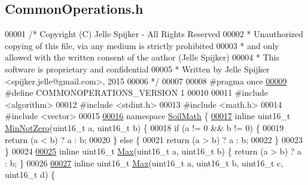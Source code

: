 \hypertarget{_common_operations_8h_source}{}\subsection{Common\+Operations.\+h}
\label{_common_operations_8h_source}

\begin{DoxyCode}
00001 \textcolor{comment}{/* Copyright (C) Jelle Spijker - All Rights Reserved}
00002 \textcolor{comment}{ * Unauthorized copying of this file, via any medium is strictly prohibited}
00003 \textcolor{comment}{ * and only allowed with the written consent of the author (Jelle Spijker)}
00004 \textcolor{comment}{ * This software is proprietary and confidential}
00005 \textcolor{comment}{ * Written by Jelle Spijker <spijker.jelle@gmail.com>, 2015}
00006 \textcolor{comment}{ */}
00007 
00008 \textcolor{preprocessor}{#pragma once}
\hypertarget{_common_operations_8h_source_l00009}{}\hyperlink{_common_operations_8h_a2eaf90dc9ea1487911cc3005ae0b1bf3}{00009} \textcolor{preprocessor}{#define COMMONOPERATIONS\_VERSION 1}
00010 
00011 \textcolor{preprocessor}{#include <algorithm>}
00012 \textcolor{preprocessor}{#include <stdint.h>}
00013 \textcolor{preprocessor}{#include <math.h>}
00014 \textcolor{preprocessor}{#include <vector>}
00015 
\hypertarget{_common_operations_8h_source_l00016}{}\hyperlink{namespace_soil_math}{00016} \textcolor{keyword}{namespace }\hyperlink{namespace_soil_math}{SoilMath} \{
\hypertarget{_common_operations_8h_source_l00017}{}\hyperlink{namespace_soil_math_add4ac871cc7f2ece16e716a5cfa61847}{00017} \textcolor{keyword}{inline} uint16\_t \hyperlink{namespace_soil_math_add4ac871cc7f2ece16e716a5cfa61847}{MinNotZero}(uint16\_t a, uint16\_t b) \{
00018   \textcolor{keywordflow}{if} (a != 0 && b != 0) \{
00019     \textcolor{keywordflow}{return} (a < b) ? a : b;
00020   \} \textcolor{keywordflow}{else} \{
00021     \textcolor{keywordflow}{return} (a > b) ? a : b;
00022   \}
00023 \}
00024 
\hypertarget{_common_operations_8h_source_l00025}{}\hyperlink{namespace_soil_math_a9d385c44fb7e60a278a6eee8446f7b64}{00025} \textcolor{keyword}{inline} uint16\_t \hyperlink{namespace_soil_math_a9d385c44fb7e60a278a6eee8446f7b64}{Max}(uint16\_t a, uint16\_t b) \{ \textcolor{keywordflow}{return} (a > b) ? a : b; \}
00026 
\hypertarget{_common_operations_8h_source_l00027}{}\hyperlink{namespace_soil_math_a4b71f10349d360c1d7c6313bb01c988f}{00027} \textcolor{keyword}{inline} uint16\_t \hyperlink{namespace_soil_math_a9d385c44fb7e60a278a6eee8446f7b64}{Max}(uint16\_t a, uint16\_t b, uint16\_t c, uint16\_t d) \{

\end{DoxyCode}
